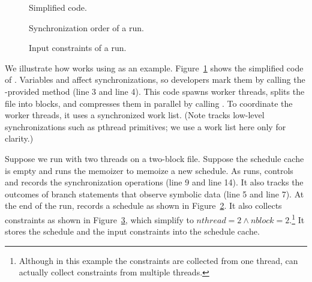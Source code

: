 \begin{figure}[t]
\centering
\begin{minipage}[c]{.8\linewidth}
\tiny {}
\end{minipage}
\caption{\small Simplified \pbzip code.}
\label{fig:tern-pbzip2}
\end{figure}

\begin{figure}[t]
\hspace{1.5in}
\begin{minipage}[c]{.8\linewidth}
\tiny {}
\end{minipage}
\caption{\small Synchronization order of a \pbzip run.}
\label{fig:tern-pbzip2-sync-order}
\end{figure}

\begin{figure}[t]
\centering
\begin{minipage}[c]{0.4\linewidth}
\tiny {}
\end{minipage}
\caption{\small Input constraints of a \pbzip run.}
\label{fig:tern-pbzip2-constraints}
\end{figure}

We illustrate how \tern works using \pbzip as an example.
Figure~\ref{fig:tern-pbzip2} shows the simplified code of \pbzip.  Variables
 and  affect synchronizations, so developers mark
them by calling the \tern-provided method  (line 3 and line 4). 
This
code spawns  worker threads, splits the file into 
blocks, and compresses them in parallel by calling .  To
coordinate the worker threads, it uses a synchronized work list. (Note \tern
tracks
low-level synchronizations such as pthread primitives; we use a work list
here only for clarity.)

Suppose we run \pbzip with two threads on a two-block file.  Suppose the
schedule cache is empty and \tern runs the memoizer to memoize a new
schedule.  As \pbzip runs, \tern controls and records the synchronization
operations (line 9 and line 14).  It also tracks the outcomes of branch
statements that observe symbolic data (line 5 and line 7).  At the end of the
run, \tern records a schedule as shown in
Figure~\ref{fig:tern-pbzip2-sync-order}.  It also collects constraints as shown
in Figure~\ref{fig:tern-pbzip2-constraints}, which simplify to $nthread=2
\wedge nblock=2$.\footnote{Although in this example the constraints are
  collected from one thread, \tern can actually collect constraints from
  multiple threads.}  It stores the schedule and the input constraints
into the schedule cache.

